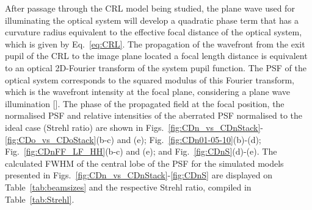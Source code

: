 \begin{refsection}
After passage through the CRL model being studied, the plane wave used for illuminating the optical system will develop a quadratic phase term that has a curvature radius equivalent to the effective focal distance of the optical system, which is given by Eq.~\ref{eq:CRL}. The propagation of the wavefront from the exit pupil of the CRL to the image plane located a focal length distance is equivalent to an optical 2D-Fourier transform of the system pupil function. The PSF of the optical system corresponds to the squared modulus of this Fourier transform, which is the wavefront intensity at the focal plane, considering a plane wave illumination [\cite[\textit{\S2.3.1} \& \textit{\S6.2}]{Goodman2017}]. The phase of the propagated field at the focal position, the normalised PSF and relative intensities of the aberrated PSF normalised to the ideal case (Strehl ratio) are shown in Figs.~\ref{fig:CDn_vs_CDnStack}-\ref{fig:CDo_vs_CDoStack}(b-c) and (e);  Fig.~\ref{fig:CDn01-05-10}(b)-(d); Fig.~\ref{fig:CDnFF_LF_HH}(b-c) and (e); and Fig.~\ref{fig:CDnS}(d)-(e). The calculated FWHM of the central lobe of the PSF for the simulated models presented in Figs.~\ref{fig:CDn_vs_CDnStack}-\ref{fig:CDnS} are displayed on Table~\ref{tab:beamsizes} and the respective Strehl ratio, compiled in Table~\ref{tab:Strehl}.


\begin{table}[t]
\caption[Strehl ratio for the simulated models in Figs.~\ref{fig:CDn_vs_CDnStack}-\ref{fig:CDnS}]{Comparison of the Strehl ratio for the simulated models in Figs.~\ref{fig:CDn_vs_CDnStack}-\ref{fig:CDnS}}\label{tab:Strehl}%
{}
\end{table}{}



\end{refsection}

